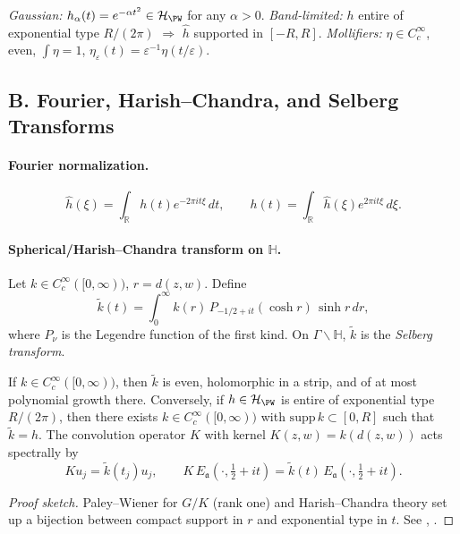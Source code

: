 \begin{example}
\emph{Gaussian:} $h_\alpha(t)=e^{-\alpha t^2}\in\mathcal H_{\PW}$ for any $\alpha>0$. \;
\emph{Band-limited:} $h$ entire of exponential type $R/(2\pi)$ $\Rightarrow$ $\hat h$ supported in $[-R,R]$. \;
\emph{Mollifiers:} $\eta\in C_c^\infty$, even, $\int\eta=1$, $\eta_\varepsilon(t)=\varepsilon^{-1}\eta(t/\varepsilon)$.
\end{example}


\subsection*{B. Fourier, Harish–Chandra, and Selberg Transforms}
\label{subsec:transforms-sharp-patched}

\paragraph{Fourier normalization.}
\[
  \hat h(\xi)=\int_{\mathbb R} h(t)e^{-2\pi i t\xi}\,dt,
  \qquad
  h(t)=\int_{\mathbb R}\hat h(\xi)e^{2\pi i t\xi}\,d\xi.
\]

\paragraph{Spherical/Harish–Chandra transform on $\mathbb H$.}
Let $k\in C_c^\infty([0,\infty))$, $r=d(z,w)$. Define
\[
  \widetilde k(t)=\int_0^\infty k(r)\,P_{-1/2+it}(\cosh r)\,\sinh r\,dr,
\]
where $P_\nu$ is the Legendre function of the first kind. On $\Gamma\backslash\mathbb H$, $\widetilde k$ is the \emph{Selberg transform}.

\begin{theorem}
\label{thm:selberg-duality-sharp-patched}
If $k\in C_c^\infty([0,\infty))$, then $\widetilde k$ is even, holomorphic in a strip, and of at most polynomial growth there. Conversely, if $h\in\mathcal H_{\PW}$ is entire of exponential type $R/(2\pi)$, then there exists $k\in C_c^\infty([0,\infty))$ with $\mathrm{supp}\,k\subset[0,R]$ such that $\widetilde k=h$. The convolution operator $K$ with kernel $K(z,w)=k(d(z,w))$ acts spectrally by
\[
  Ku_j=\widetilde k(t_j)u_j,\qquad
  K\,E_{\mathfrak a}(\cdot,\tfrac12+it)=\widetilde k(t)\,E_{\mathfrak a}(\cdot,\tfrac12+it).
\]
\end{theorem}

\begin{proof}[Proof sketch]
Paley–Wiener for $G/K$ (rank one) and Harish–Chandra theory set up a bijection between compact support in $r$ and exponential type in $t$. See \cite[Ch.~IV,V]{HelgasonGGA}, \cite[§2]{Hejhal1983}.
\end{proof}

